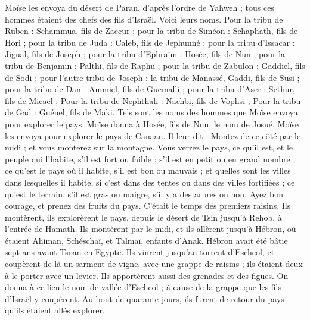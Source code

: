 \begin{multicols}{2}
Moïse les envoya du désert de Paran, d’après l’ordre de Yahweh ; tous ces hommes étaient des chefs des fils d'Israël.
Voici leurs noms. Pour la tribu de Ruben : Schammua, fils de Zaccur ;
pour la tribu de Siméon : Schaphath, fils de Hori ;
pour la tribu de Juda : Caleb, fils de Jephunné ;
pour la tribu d'Issacar : Jigual, fils de Joseph ;
pour la tribu d'Ephraïm : Hosée, fils de Nun ;
pour la tribu de Benjamin : Palthi, fils de Raphu ;
pour la tribu de Zabulon : Gaddiel, fils de Sodi ;
pour l’autre tribu de Joseph : la tribu de Manassé, Gaddi, fils de Susi ;
pour la tribu de Dan : Ammiel, fils de Guemalli ;
pour la tribu d'Aser : Sethur, fils de Micaël ;
Pour la tribu de Nephthali : Nachbi, fils de Vophsi ;
Pour la tribu de Gad : Guéuel, fils de Maki.
Tels sont les noms des hommes que Moïse envoya pour explorer le pays. Moïse donna à Hosée, fils de Nun, le nom de Josué.
Moïse les envoya pour explorer le pays de Canaan. Il leur dit : Montez de ce côté par le midi ; et vous monterez sur la montagne.
Vous verrez le pays, ce qu’il est, et le peuple qui l'habite, s'il est fort ou faible ; s'il est en petit ou en grand nombre ;
ce qu’est le pays où il habite, s'il est bon ou mauvais ; et quelles sont les villes dans lesquelles il habite, si c'est dans des tentes ou dans des villes fortifiées ;
ce qu’est le terrain, s'il est gras ou maigre, s'il y a des arbres ou non. Ayez bon courage, et prenez des fruits du pays. C'était le temps des premiers raisins.
Ils montèrent, ils explorèrent le pays, depuis le désert de Tsin jusqu'à Rehob, à l'entrée de Hamath.
Ils montèrent par le midi, et ils allèrent jusqu'à Hébron, où étaient Ahiman, Schéschaï, et Talmaï, enfants d’Anak. Hébron avait été bâtie sept ans avant Tsoan en Egypte.
Ils vinrent jusqu'au torrent d'Eschcol, et coupèrent de là un sarment de vigne, avec une grappe de raisins ; ils étaient deux à le porter avec un levier. Ils apportèrent aussi des grenades et des figues.
On donna à ce lieu le nom de vallée d’Eschcol ; à cause de la grappe que les fils d'Israël y coupèrent.
Au bout de quarante jours, ils furent de retour du pays qu'ils étaient allés explorer.

\end{multicols}
